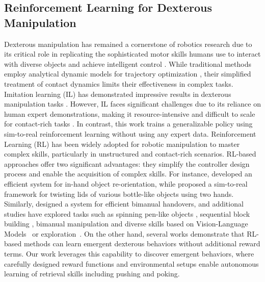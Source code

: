 \subsection{Reinforcement Learning for Dexterous Manipulation}
Dexterous manipulation has remained a cornerstone of robotics research due to its critical role in replicating the sophisticated motor skills humans use to interact with diverse objects and achieve intelligent control \cite{6907059,1087038,6907864}. While traditional methods employ analytical dynamic models for trajectory optimization
, their simplified treatment of contact dynamics limits their effectiveness in complex tasks. Imitation learning (IL) has demonstrated impressive results in dexterous manipulation tasks \cite{9561802, pmlr-v205-chen23b}. However, IL faces significant challenges due to its reliance on human expert demonstrations, making it resource-intensive and difficult to scale for contact-rich tasks \cite{chen2024objectcentric, yang2024anyrotate, lin2024twisting}. In contrast, this work trains a generalizable policy using sim-to-real reinforcement learning without using any expert data. Reinforcement Learning (RL) has been widely adopted for robotic manipulation to master complex skills, particularly in unstructured and contact-rich scenarios. RL-based approaches offer two significant advantages: they simplify the controller design process and enable the acquisition of complex skills. For instance, \citet{pmlr-v164-chen22a} developed an efficient system for in-hand object re-orientation, while \citet{lin2024twisting} proposed a sim-to-real framework for twisting lids of various bottle-like objects using two hands. Similarly, \citet{pmlr-v229-huang23d} designed a system for efficient bimanual handovers, and additional studies have explored tasks such as spinning pen-like objects \cite{wang2024lessons}, sequential block building \cite{pmlr-v229-chen23e}, bimanual manipulation \cite{10343126, lin2024twisting} and diverse skills based on Vision-Language Models~\cite{liu2025vlp, sun2024large} or exploration~\cite{Bai_Zhang_Tao_Wu_Wang_Xu_2023, zhang2025beta}. On the other hand, several works \cite{zhou2022learning, pmlr-v229-agarwal23a, yang2024anyrotate, lin2024twisting} demonstrate that RL-based methods can learn emergent dexterous behaviors without additional reward terms. Our work leverages this capability to discover emergent behaviors, where carefully designed reward functions and environmental setups enable autonomous learning of retrieval skills including pushing and poking.